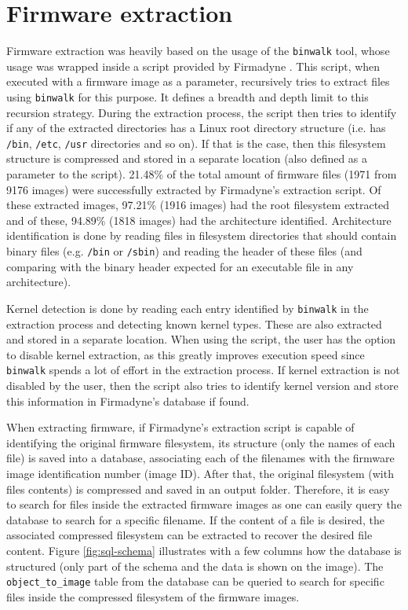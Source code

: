 \section{Firmware extraction}
\label{sec:firmware-extraction}

Firmware extraction was heavily based on the usage of the {\tt binwalk} tool, whose usage was wrapped inside a script provided by Firmadyne \cite{firmadyne}. This script, when executed with a firmware image as a parameter, recursively tries to extract files using {\tt binwalk} for this purpose. It defines a breadth and depth limit to this recursion strategy. During the extraction process, the script then tries to identify if any of the extracted directories has a Linux root directory structure (i.e. has {\tt /bin}, {\tt /etc}, {\tt /usr} directories and so on). If that is the case, then this filesystem structure is compressed and stored in a separate location (also defined as a parameter to the script). 21.48\% of the total amount of firmware files (1971 from 9176 images) were successfully extracted by Firmadyne's \cite{firmadyne} extraction script. Of these extracted images, 97.21\% (1916 images) had the root filesystem extracted and of these, 94.89\% (1818 images) had the architecture identified. Architecture identification is done by reading files in filesystem directories that should contain binary files (e.g. {\tt /bin} or {\tt /sbin}) and reading the header of these files (and comparing with the binary header expected for an executable file in any architecture).

Kernel detection is done by reading each entry identified by {\tt binwalk} in the extraction process and detecting known kernel types. These are also extracted and stored in a separate location. When using the script, the user has the option to disable kernel extraction, as this greatly improves execution speed since {\tt binwalk} spends a lot of effort in the extraction process. If kernel extraction is not disabled by the user, then the script also tries to identify kernel version and store this information in Firmadyne's \cite{firmadyne} database if found.

When extracting firmware, if Firmadyne's extraction script is capable of identifying the original firmware filesystem, its structure (only the names of each file) is saved into a database, associating each of the filenames with the firmware image identification number (image ID). After that, the original filesystem (with files contents) is compressed and saved in an output folder. Therefore, it is easy to search for files inside the extracted firmware images as one can easily query the database to search for a specific filename. If the content of a file is desired, the associated compressed filesystem can be extracted to recover the desired file content. Figure \ref{fig:sql-schema} illustrates with a few columns how the database is structured (only part of the schema and the data is shown on the image). The {\tt object\_to\_image} table from the database can be queried to search for specific files inside the compressed filesystem of the firmware images.

